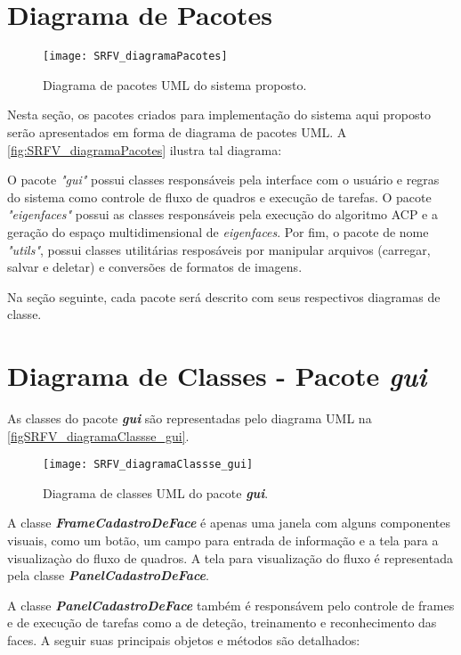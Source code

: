 \section{Diagrama de Pacotes}\label{sec:diagpacs}

\begin{figure}[h]
	\centering
	\texttt{[image: SRFV\_diagramaPacotes]}
	\caption{Diagrama de pacotes UML do sistema proposto.}
	\label{fig:SRFV_diagramaPacotes}
\end{figure}

Nesta seção, os pacotes criados para implementação do sistema aqui proposto serão apresentados em forma de diagrama de pacotes UML. A \autoref{fig:SRFV_diagramaPacotes} ilustra tal diagrama:


O pacote \textit{"gui"} possui classes responsáveis pela interface com o usuário e regras do sistema como controle de fluxo de quadros e execução de tarefas. O pacote \textit{"eigenfaces"} possui as classes responsáveis pela execução do algoritmo ACP e a geração do espaço multidimensional de \textit{eigenfaces}. Por fim, o pacote de nome \textit{"utils"}, possui classes utilitárias resposáveis por manipular arquivos (carregar, salvar e deletar) e conversões de formatos de imagens. 

Na seção seguinte, cada pacote será descrito com seus respectivos diagramas de classe.

\section{Diagrama de Classes - Pacote \textit{\textbf{gui}}}\label{sec:diagclasses}
As classes do pacote \textbf{\textit{gui}} são representadas pelo diagrama UML na \autoref{figSRFV_diagramaClassse_gui}.

\begin{figure}[h]
	\centering
	\texttt{[image: SRFV\_diagramaClassse\_gui]}
	\caption{Diagrama de classes UML do pacote \textbf{\textit{gui}}.}
	\label{figSRFV_diagramaClassse_gui}
\end{figure}

A classe \textbf{\textit{FrameCadastroDeFace}} é apenas uma janela com alguns componentes visuais, como um botão, um campo para entrada de informação e a tela para a visualizaçào do fluxo de quadros. A tela para visualização do fluxo é representada pela classe \textbf{\textit{PanelCadastroDeFace}}.

A classe \textbf{\textit{PanelCadastroDeFace}} também é responsávem pelo controle de frames e de execução de tarefas como a de deteção, treinamento e reconhecimento das faces. A seguir suas principais objetos e métodos são detalhados:

